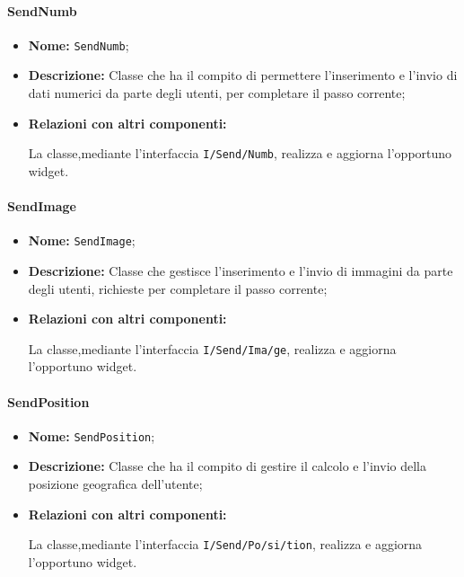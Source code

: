 \paragraph{SendNumb}
\begin{flushleft}
\begin{itemize}
\item \textbf{Nome:} \texttt{SendNumb};
\item \textbf{Descrizione:} Classe che ha il compito di permettere l'inserimento e l'invio di dati numerici da parte degli utenti, per completare il passo corrente;
\item \textbf{Relazioni con altri componenti:}
\begin{sloppypar}
La classe,mediante l'interfaccia \texttt{I\fshyp{}Send\fshyp{}Numb}, realizza e aggiorna l'opportuno widget.
\end{sloppypar}
\end{itemize}
\end{flushleft}

\paragraph{SendImage}
\begin{flushleft}
\begin{itemize}
\item \textbf{Nome:} \texttt{SendImage};
\item \textbf{Descrizione:} Classe che gestisce l'inserimento e l'invio di immagini da parte degli utenti, richieste per completare il passo corrente;
\item \textbf{Relazioni con altri componenti:}
\begin{sloppypar}
La classe,mediante l'interfaccia \texttt{I\fshyp{}Send\fshyp{}Ima\fshyp{}ge}, realizza e aggiorna l'opportuno widget.
\end{sloppypar}
\end{itemize}
\end{flushleft}

\paragraph{SendPosition}
\begin{flushleft}
\begin{itemize}
\item \textbf{Nome:} \texttt{SendPosition};
\item \textbf{Descrizione:} Classe che ha il compito di gestire il calcolo e l'invio della posizione geografica dell'utente;
\item \textbf{Relazioni con altri componenti:}
\begin{sloppypar}
La classe,mediante l'interfaccia \texttt{I\fshyp{}Send\fshyp{}Po\fshyp{}si\fshyp{}tion}, realizza e aggiorna l'opportuno widget.
\end{sloppypar}
\end{itemize}
\end{flushleft}


